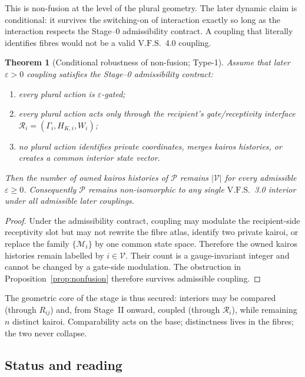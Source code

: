 \documentclass[11pt,a4paper]{article}
\newcommand{\VFS}{\ensuremath{\mathrm{V.F.S.}}}
\theoremstyle{definition}
\theoremstyle{plain}
\newtheorem{theorem}[definition]{Theorem}
\theoremstyle{remark}
\begin{document}
This is non-fusion at the level of the plural geometry. The later dynamic claim is
conditional: it survives the switching-on of interaction exactly so long as the
interaction respects the Stage--0 admissibility contract. A coupling that literally
identifies fibres would not be a valid \VFS\ 4.0 coupling.

\begin{theorem}[Conditional robustness of non-fusion; Type-1]\label{thm:robust}
Assume that later \(\varepsilon>0\) coupling satisfies the Stage--0 admissibility
contract:
\begin{enumerate}[label=\textup{(\roman*)},leftmargin=1.2cm]
\item every plural action is \(\varepsilon\)-gated;
\item every plural action acts only through the recipient's gate/receptivity
interface \(\mathcal R_i=(\Gamma_i,H_{K,i},W_i)\);
\item no plural action identifies private coordinates, merges kairos histories, or
creates a common interior state vector.
\end{enumerate}
Then the number of owned kairos histories of \(\mathcal P\) remains
\(|\mathcal V|\) for every admissible \(\varepsilon\ge0\). Consequently
\(\mathcal P\) remains non-isomorphic to any single \VFS\ 3.0 interior under all
admissible later couplings.
\end{theorem}

\begin{proof}
Under the admissibility contract, coupling may modulate the recipient-side
receptivity slot but may not rewrite the fibre atlas, identify two private kairoi,
or replace the family \(\{\mathcal M_i\}\) by one common state space. Therefore the
owned kairos histories remain labelled by \(i\in\mathcal V\). Their count is a
gauge-invariant integer and cannot be changed by a gate-side modulation. The
obstruction in Proposition~\ref{prop:nonfusion} therefore survives admissible
coupling. \qedhere
\end{proof}

\noindent The geometric core of the stage is thus secured: interiors may be compared
(through \(R_{ij}\)) and, from Stage~II onward, coupled (through \(\mathcal R_i\)), while
remaining \(n\) distinct kairoi. Comparability acts on the base; distinctness lives in the
fibres; the two never collapse.

\subsection{Status and reading}
\end{document}
